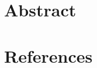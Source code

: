 \documentclass[12pt,a4paper,oneside,pdftex]{report}
\begin{document}
\title{\TITLE}
\subtitle{\SUBTITLE}
\author{\AUTHOR}
\date{(Draft)}
\maketitle

\chapter{Abstract}
\ABSTRACTEN















\chapter{References}
\end{document}
